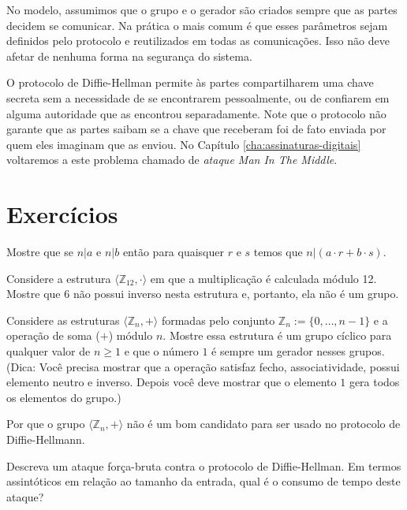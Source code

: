 No modelo, assumimos que o grupo e o gerador são criados sempre que as partes decidem se comunicar.
Na prática o mais comum é que esses parâmetros sejam definidos pelo protocolo e reutilizados em todas as comunicações.
Isso não deve afetar de nenhuma forma na segurança do sistema.

O protocolo de Diffie-Hellman permite às partes compartilharem uma chave secreta sem a necessidade de se encontrarem pessoalmente, ou de confiarem em alguma autoridade que as encontrou separadamente.
Note que o protocolo não garante que as partes saibam se a chave que receberam foi de fato enviada por quem eles imaginam que as enviou.
No Capítulo \ref{cha:assinaturas-digitais} voltaremos a este problema chamado de {\em ataque Man In The Middle}.

\section{Exercícios}

\begin{exercicio}
  Mostre que se $n|a$ e $n|b$ então para quaisquer $r$ e $s$ temos que $n|(a \cdot r + b \cdot s)$.
\end{exercicio}

\begin{exercicio}
\label{ex:grupo}
  Considere a estrutura $\langle \mathbb{Z}_{12}, \cdot \rangle$ em que a multiplicação é calculada módulo 12.
Mostre que $6$ não possui inverso nesta estrutura e, portanto, ela não é um grupo.
\end{exercicio}

\begin{exercicio}
  Considere as estruturas $\langle \mathbb{Z}_n, + \rangle$ formadas pelo conjunto $\mathbb{Z}_n := \{0, \dots, n-1\}$ e a operação de soma ($+$) módulo $n$.
  Mostre essa estrutura é um grupo cíclico para qualquer valor de $n \geq 1$ e que o número $1$ é sempre um gerador nesses grupos. (Dica: Você precisa mostrar que a operação satisfaz fecho, associatividade, possui elemento neutro e inverso. Depois você deve mostrar que o elemento $1$ gera todos os elementos do grupo.)

  Por que o grupo $\langle \mathbb{Z}_n, +\rangle$ não é um bom candidato para ser usado no protocolo de Diffie-Hellmann.
\end{exercicio}

\begin{exercicio}
  Descreva um ataque força-bruta contra o protocolo de Diffie-Hellman.
  Em termos assintóticos em relação ao tamanho da entrada, qual é o consumo de tempo deste ataque?
\end{exercicio}
